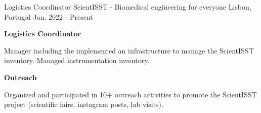 

\begin{cventries}

 \cventry
    {Logistics Coordinator} %
    {ScientISST - Biomedical engineering for everyone} %
    {Lisbon, Portugal} %
    {Jan. 2022 - Present} %
    {
      \begin{cvitems} %
        \item[] {\textbf{Logistics Coordinator}}
        \item {Manager including the implemented an infrastructure to manage the ScientISST inventory. Managed instrumentation inventory.}
        \item[] {\textbf{Outreach}}
        \item {Organized and participated in 10+ outreach activities to promote the ScientISST project (scientific fairs, instagram posts, lab visits).}
      \end{cvitems}
    }
\end{cventries}
